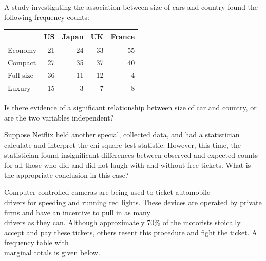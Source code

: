 \documentclass[11pt, chapterprefix=true]{scrbook}\usepackage[]{graphicx}\usepackage[]{color}
\begin{document}
\begin{exercises}
\begin{exercise}
\end{exercise}
\begin{solution}  %

\end{solution}

\begin{exercise} %

A study investigating the association between size of cars and country found the following frequency counts:

\begin{table}[ht]
\centering 
\begin{tabular}{@{} lrrrr @{}} \hline
         & US & Japan & UK & France \\ \hline
Economy & 21 & 24 & 33 & 55 \\
Compact & 27 & 35 & 37 & 40 \\
Full size & 36 & 11 & 12 & 4 \\
Luxury  & 15 & 3 & 7 & 8 \\ \hline
\end{tabular}
\end{table}

Is there evidence of a significant relationship between size of car and country, or are the two variables independent?
\end{exercise}
\begin{solution} %

\end{solution}

\begin{exercise} %

Suppose Netflix held another special, collected data, and had a statistician calculate and interpret the chi square test statistic. However, this time, the statistician found insignificant differences between observed and expected counts for all those who did and did not laugh with and without free tickets. What is the appropriate conclusion in this case?
\end{exercise}
\begin{solution} %

\end{solution}

\begin{exercise} %

Computer-controlled cameras are being used to ticket automobile \\ drivers for speeding and running red lights.  These devices are operated by private firms and have an incentive to pull in as many \\ drivers as they can.  Although approximately 70\% of the motorists stoically accept and pay these tickets, others resent this procedure and fight the ticket.  A frequency table with \\ marginal totals is given below. 


\end{exercise}
\end{exercises}
\end{document}
